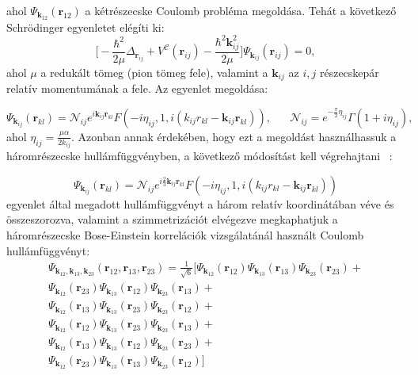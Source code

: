 \documentclass[11pt,a4paper]{article}
\numberwithin{equation}{subsection}
\numberwithin{figure}{section}
\begin{document}
ahol $\Psi_{\bm{k}_{12}}(\bm{r}_{12})$ a kétrészecske Coulomb probléma megoldása. Tehát a következő Schrödinger egyenletet elégíti ki:
\begin{equation}
\Bigg[-\frac{\hbar^2}{2\mu}\Delta_{\bm{r}_{ij}}+V^\mathcal{C}(\bm{r}_{ij})-\frac{\hbar^2 \bm{k}^2_{ij}}{2\mu}
\Bigg]\Psi_{\bm{k}_{ij}}(\bm{r}_{ij})=0,
\end{equation}
ahol $\mu$ a redukált tömeg (pion tömeg fele), valamint a $\bm{k}_{ij}$ az $i,j$ részecskepár relatív momentumának a fele. Az egyenlet megoldása:

\begin{equation}
\Psi_{\bm{k}_{ij}}(\bm{r}_{kl}) = \mathcal{N}_{ij}e^{i\bm{k}_{ij}\bm{r}_{kl}}F(-i\eta_{ij},1,i(k_{ij}r_{kl}-\bm{k}_{ij}\bm{r}_{kl})),\;\;\;\;\;\;
\mathcal{N}_{ij}=e^{-\frac{\pi}{2}\eta_{ij}}\Gamma(1+i\eta_{ij}),
\end{equation}
ahol $\eta_{ij}=\frac{\mu\alpha}{2k_{ij}}$. Azonban annak érdekében, hogy ezt a megoldást használhassuk a háromrészecske hullámfüggvényben, a következő módosítást kell végrehajtani  ~\cite{Alt:1998nr,Biyajima:2003ey, Mizoguchi:2000km}:

\begin{equation}
\Psi_{\bm{k}_{ij}}(\bm{r}_{kl}) = \mathcal{N}_{ij}e^{i\frac{2}{3}\bm{k}_{ij}\bm{r}_{kl}}F(-i\eta_{ij},1,i(k_{ij}r_{kl}-\bm{k}_{ij}\bm{r}_{kl}))
\label{eq:Psikij}
\end{equation}
 egyenlet által megadott hullámfüggvényt a három relatív koordinátában véve és összeszorozva, valamint a szimmetrizációt elvégezve megkaphatjuk a háromrészecske Bose-Einstein korrelációk vizsgálatánál használt Coulomb hullámfüggvényt:
\begin{equation}
\begin{aligned}
\Psi_{\bm{k}_{12}, \bm{k}_{13}, \bm{k}_{23}}(\bm{r}_{12},\bm{r}_{13},\bm{r}_{23})  = \frac{1}{\sqrt{6}}\Bigg[
\Psi_{\bm{k}_{12}}(\bm{r}_{12})\Psi_{\bm{k}_{13}}(\bm{r}_{13})\Psi_{\bm{k}_{23}}(\bm{r}_{23})+\\
\Psi_{\bm{k}_{12}}(\bm{r}_{23})\Psi_{\bm{k}_{13}}(\bm{r}_{12})\Psi_{\bm{k}_{23}}(\bm{r}_{13})+\\ 
\Psi_{\bm{k}_{12}}(\bm{r}_{13})\Psi_{\bm{k}_{13}}(\bm{r}_{23})\Psi_{\bm{k}_{23}}(\bm{r}_{12})+\\
\Psi_{\bm{k}_{12}}(\bm{r}_{12})\Psi_{\bm{k}_{13}}(\bm{r}_{23})\Psi_{\bm{k}_{23}}(\bm{r}_{13})+\\
\Psi_{\bm{k}_{12}}(\bm{r}_{13})\Psi_{\bm{k}_{13}}(\bm{r}_{12})\Psi_{\bm{k}_{23}}(\bm{r}_{23})+\\
\Psi_{\bm{k}_{12}}(\bm{r}_{23})\Psi_{\bm{k}_{13}}(\bm{r}_{13})\Psi_{\bm{k}_{23}}(\bm{r}_{12})
\Bigg]
\end{aligned}
\end{equation}
\end{document}
